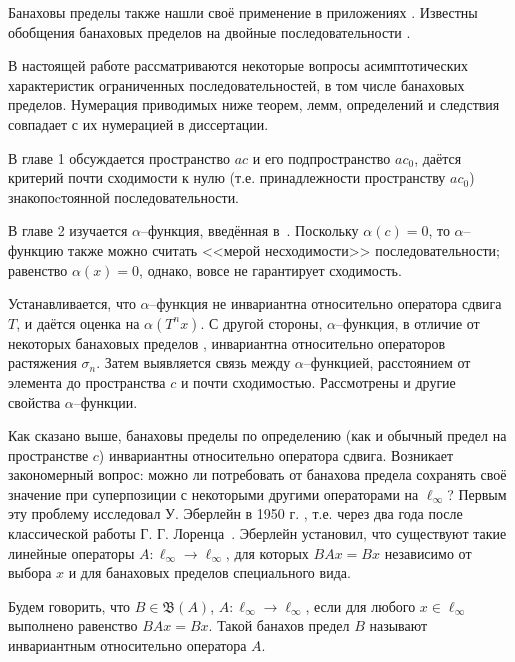 
Банаховы пределы также нашли своё применение в приложениях
\cite{semenov2015banachtraces,semenov2009fourier,strukova2015spectres}.
Известны обобщения банаховых пределов на двойные последовательности
\cite{edely2004almost}.



В настоящей работе рассматриваются некоторые вопросы асимптотических характеристик ограниченных последовательностей,
в том числе банаховых пределов.
Нумерация приводимых ниже теорем, лемм, определений и следствия совпадает с их нумерацией в диссертации.


В главе 1 обсуждается пространство $ac$ и его подпространство $ac_0$,
даётся критерий почти сходимости к нулю (т.е. принадлежности пространству $ac_0$)
знакопоcтоянной последовательности.




В главе 2
изучается $\alpha$--функция, введённая в~\cite{our-vzms-2018}.
%
%
Поскольку $\alpha(c)=0$,
то $\alpha$--функцию также можно считать <<мерой несходимости>> последовательности;
равенство $\alpha(x) = 0$, однако, вовсе не гарантирует сходимость.

Устанавливается, что $\alpha$--функция не инвариантна относительно оператора сдвига $T$,
и даётся оценка на $\alpha(T^n x)$.
С другой стороны, $\alpha$--функция, в отличие от некоторых банаховых пределов
\cite{Semenov2010invariant,Semenov2011dan},
инвариантна относительно операторов растяжения $\sigma_n$.
Затем выявляется связь между $\alpha$--функцией, расстоянием от элемента до пространства $c$
и почти сходимостью.
Рассмотрены и другие свойства $\alpha$--функции.




Как сказано выше, банаховы пределы по определению (как и обычный предел на пространстве $c$) инвариантны относительно оператора сдвига.
Возникает закономерный вопрос: можно ли потребовать от банахова предела сохранять своё значение
при суперпозиции с некоторыми другими операторами на $\ell_\infty$?
Первым эту проблему исследовал У. Эберлейн в 1950 г. \cite{Eberlein},
т.е. через два года после классической работы Г. Г. Лоренца~\cite{lorentz1948contribution}.
Эберлейн установил, что существуют такие линейные операторы  $A : \ell_\infty\to \ell_\infty$,
для которых $BAx = Bx$ независимо от выбора $x$ и для банаховых пределов специального вида.

Будем говорить, что $B\in\mathfrak B(A)$, $A : \ell_\infty\to \ell_\infty$, если для любого $x\in \ell_\infty$
выполнено равенство $BAx = Bx$.
Такой банахов предел $B$ называют инвариантным относительно оператора $A$.

